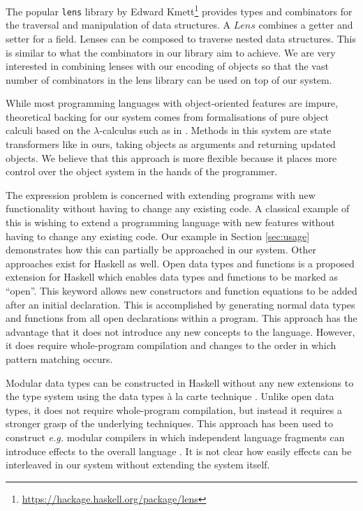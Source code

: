 The popular \texttt{lens} library by Edward Kmett\footnote{\url{https://hackage.haskell.org/package/lens}} provides types and combinators for the traversal and manipulation of data structures. A $\mathit{Lens}$ combines a getter and setter for a field. Lenses can be composed to traverse nested data structures. This is similar to what the combinators in our library aim to achieve. We are very interested in combining lenses with our encoding of objects so that the vast number of combinators in the lens library can be used on top of our system. 

While most programming languages with object-oriented features are impure, theoretical backing for our system comes from formalisations of pure object calculi based on the $\lambda$-calculus such as in \citet{pierce1994simple}. Methods in this system are state transformers like in ours, taking objects as arguments and returning updated objects. We believe that this approach is more flexible because it places more control over the object system in the hands of the programmer.


The expression problem \cite{wadler1998expression} is concerned with extending programs with new functionality without having to change any existing code. A classical example of this is wishing to extend a programming language with new features without having to change any existing code. Our example in Section \ref{sec:usage} demonstrates how this can partially be approached in our system. Other approaches exist for Haskell as well. Open data types and functions \cite{loh2006open} is a proposed extension for Haskell which enables data types and functions to be marked as ``open''. This keyword allows new constructors and function equations to be added after an initial declaration. This is accomplished by generating normal data types and functions from all open declarations within a program. This approach has the advantage that it does not introduce any new concepts to the language. However, it does require whole-program compilation and changes to the order in which pattern matching occurs.

Modular data types can be constructed in Haskell without any new extensions to the type system using the data types \`a la carte technique \cite{swierstra2008data}. Unlike open data types, it does not require whole-program compilation, but instead it requires a stronger grasp of the underlying techniques. This approach has been used to construct \emph{e.g.} modular compilers in which independent language fragments can introduce effects to the overall language \cite{day2012towards}. It is not clear how easily effects can be interleaved in our system without extending the system itself.

